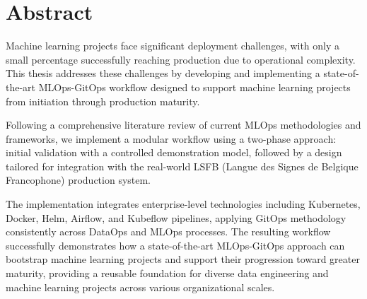 \thispagestyle{empty}
\section*{Abstract}
Machine learning projects face significant deployment challenges, with only a small percentage successfully reaching production due to operational complexity.
This thesis addresses these challenges by developing and implementing a state-of-the-art MLOps-GitOps workflow designed to support machine learning projects from initiation through production maturity.

Following a comprehensive literature review of current MLOps methodologies and frameworks, we implement a modular workflow using a two-phase approach: initial validation with a controlled demonstration model,
followed by a design tailored for integration with the real-world LSFB (Langue des Signes de Belgique Francophone) production system.

The implementation integrates enterprise-level technologies including Kubernetes, Docker, Helm, Airflow, and Kubeflow pipelines, applying GitOps methodology consistently across DataOps and MLOps processes.
The resulting workflow successfully demonstrates how a state-of-the-art MLOps-GitOps approach can bootstrap machine learning projects and support their progression toward greater maturity, providing a reusable foundation for diverse data engineering and machine learning projects across various organizational scales.


